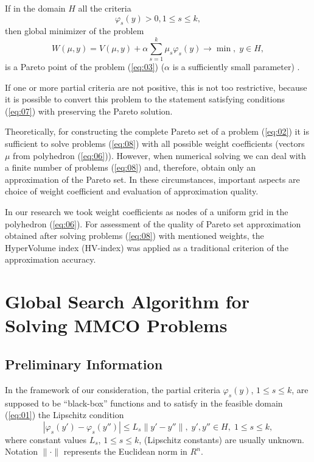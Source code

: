 \documentclass[runningheads]{llncs}
\begin{document}
If in the domain $H$ all the criteria 
\begin{equation}
    \label{eq:07}
    \varphi_s(y) > 0, 1 \leq s \leq k,
\end{equation}
then global minimizer of the problem
\begin{equation}
    \label{eq:08}
    W(\mu, y) = V(\mu, y) + \alpha \sum_{s=1}^k \mu_s \varphi_s(y) \to \min, \; y \in H,
\end{equation}
is a Pareto point of the problem (\ref{eq:03}) ($\alpha$  is a sufficiently small parameter) \cite{Wierzbicki,Marler2004}.

If one or more partial criteria are not positive, this is not too restrictive, because it is possible to convert this problem to the statement satisfying conditions (\ref{eq:07}) with preserving the Pareto solution.

Theoretically, for constructing the complete Pareto set of a problem (\ref{eq:02}) it is sufficient to solve problems (\ref{eq:08}) with all possible weight coefficients (vectors $\mu$ from polyhedron (\ref{eq:06})). However, when numerical solving we can deal with a finite number of problems (\ref{eq:08}) and, therefore, obtain only an approximation of the Pareto set. In these circumstances, important aspects are choice of weight coefficient and evaluation of approximation quality.

In our research we took weight coefficients as nodes of a uniform grid in the polyhedron (\ref{eq:06}). For assessment of the quality of Pareto set approximation obtained after solving problems (\ref{eq:08}) with mentioned weights, the HyperVolume index (HV-index) \cite{Evtushenko2014,Gergel2018} was applied as a traditional criterion of the approximation accuracy.


\section{Global Search Algorithm for Solving MMCO Problems}\label{sec:3}

\subsection{Preliminary Information}

In the framework of our consideration, the partial criteria $\varphi_s(y)$, $1 \leq s \leq k$, are supposed to be ``black-box'' functions and to satisfy in the feasible domain (\ref{eq:01}) the Lipschitz condition
\begin{equation}
    \label{eq:09}
    |\varphi_s(y') - \varphi_s(y'')| \leq L_s \|y'-y''\|, \; y', y'' \in H, \; 1 \leq s \leq k,
\end{equation}
where constant values $L_s$, $1 \leq s \leq k$, (Lipschitz constants) are usually unknown. Notation $\| \cdot \|$ represents the Euclidean norm in $R^n$.  
\end{document}
